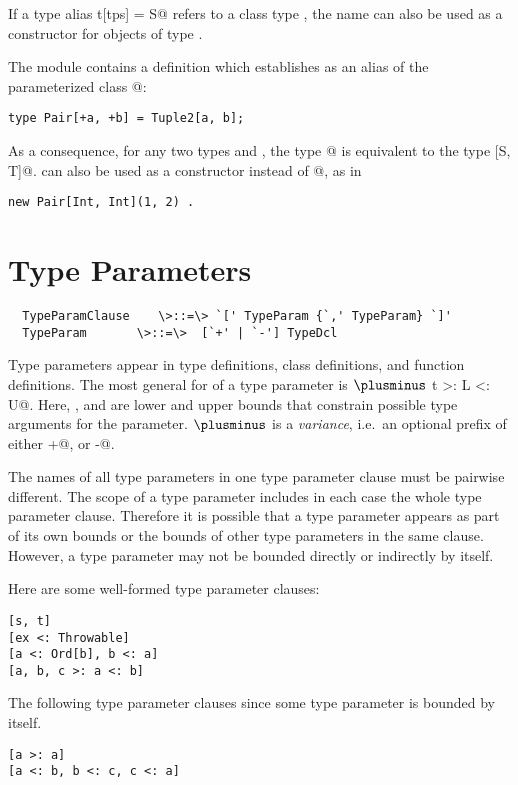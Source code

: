 \documentclass[11pt]{report}
\begin{document}
If a type alias \verb@type t[tps] = S@ refers to a class type
\verb@S@, the name \verb@t@ can also be used as a constructor for
objects of type \verb@S@.

\example The \verb@Predef@ module contains a definition which establishes \verb@Pair@ 
as an alias of the parameterized class @:
\begin{verbatim}
type Pair[+a, +b] = Tuple2[a, b];
\end{verbatim}
As a consequence, for any two types \verb@S@ and \verb@T@, the type
\verb@Pair[S, T]@ is equivalent to the type [S, T]@.
\verb@Pair@ can also be used as a constructor instead of @, as in
\begin{verbatim}
new Pair[Int, Int](1, 2) .
\end{verbatim}

\section{Type Parameters}

\syntax\begin{verbatim}
  TypeParamClause    \>::=\> `[' TypeParam {`,' TypeParam} `]'
  TypeParam       \>::=\>  [`+' | `-'] TypeDcl
\end{verbatim}

Type parameters appear in type definitions, class definitions, and
function definitions.  The most general for of a type parameter is
\verb@$\plusminus$ t >: L <: U@.  Here, \verb@L@, and \verb@U@ are lower
and upper bounds that constrain possible type arguments for the
parameter. $\plusminus$ is a {\em variance}, i.e.\ an optional prefix 
of either \verb@+@, or \verb@-@.

The names of all type parameters in one type parameter clause must be
pairwise different.  The scope of a type parameter includes in each
case the whole type parameter clause. Therefore it is possible that a
type parameter appears as part of its own bounds or the bounds of
other type parameters in the same clause.  However, a type parameter
may not be bounded directly or indirectly by itself.

\example Here are some well-formed type parameter clauses:
\begin{verbatim}
[s, t]
[ex <: Throwable]
[a <: Ord[b], b <: a]
[a, b, c >: a <: b]
\end{verbatim}
The following type parameter clauses since some type parameter is bounded by itself.
\begin{verbatim}
[a >: a]                 
[a <: b, b <: c, c <: a]
\end{verbatim}
\end{document}
